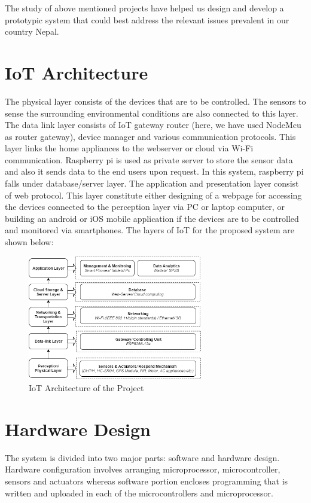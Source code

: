 \documentclass[journal,twoside]{IEEEtran}
\begin{document}
The study of above mentioned projects have helped us design
and develop a prototypic system that could best address the
relevant issues prevalent in our country Nepal.

\section{IoT Architecture}

The physical layer consists of the devices that are to be
controlled. The sensors to sense the surrounding environmental
conditions are also connected to this layer. The data link layer
consists of IoT gateway router (here, we have used NodeMcu
as router gateway), device manager and various communication
protocols. This layer links the home appliances to the webserver
or cloud via Wi-Fi communication. Raspberry pi is used as
private server to store the sensor data and also it sends data to
the end users upon request. In this system, raspberry pi falls
under database/server layer. The application and presentation
layer consist of web protocol. This layer constitute either
designing of a webpage for accessing the devices connected to
the perception layer via PC or laptop computer, or building an
android or iOS mobile application if the devices are to be
controlled and monitored via smartphones. The layers of IoT for
the proposed system are shown below:

\begin{figure}[!t]
\centering
\includegraphics[width=3.0in]{figure1}
\caption{IoT Architecture of the Project}
\label{fig:artchitecture}
\end{figure}

\section{Hardware Design}
The system is divided into two major parts: software and
hardware design. Hardware configuration involves arranging
microprocessor, microcontroller, sensors and actuators whereas
software portion encloses programming that is written and
uploaded in each of the microcontrollers and microprocessor.
\end{document}
